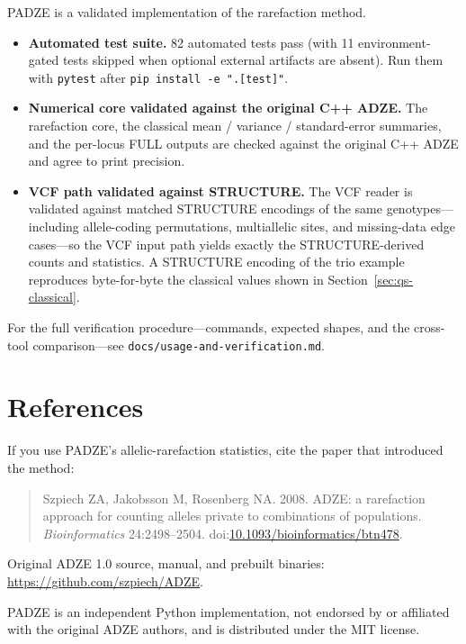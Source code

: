 \documentclass[11pt]{article}
\newcommand{\padze}{PADZE}
\begin{document}
\padze{} is a validated implementation of the rarefaction method.
\begin{itemize}
  \item \textbf{Automated test suite.} 82 automated tests pass (with 11
        environment-gated tests skipped when optional external artifacts are
        absent). Run them with \texttt{pytest} after
        \texttt{pip install -e ".[test]"}.
  \item \textbf{Numerical core validated against the original C++ ADZE.} The
        rarefaction core, the classical mean / variance / standard-error
        summaries, and the per-locus FULL outputs are checked against the
        original C++ ADZE and agree to print precision.
  \item \textbf{VCF path validated against STRUCTURE.} The VCF reader is
        validated against matched STRUCTURE encodings of the same
        genotypes---including allele-coding permutations, multiallelic sites, and
        missing-data edge cases---so the VCF input path yields exactly the
        STRUCTURE-derived counts and statistics. A STRUCTURE encoding of the trio
        example reproduces byte-for-byte the classical values shown in
        Section~\ref{sec:qs-classical}.
\end{itemize}

For the full verification procedure---commands, expected shapes, and the
cross-tool comparison---see \texttt{docs/usage-and-verification.md}.

\section{References}
\label{sec:references}

If you use \padze{}'s allelic-rarefaction statistics, cite the paper that
introduced the method:

\begin{quote}
Szpiech ZA, Jakobsson M, Rosenberg NA. 2008. ADZE: a rarefaction approach for
counting alleles private to combinations of populations. \textit{Bioinformatics}
24:2498--2504.
doi:\href{https://doi.org/10.1093/bioinformatics/btn478}{10.1093/bioinformatics/btn478}.
\end{quote}

Original ADZE 1.0 source, manual, and prebuilt binaries:
\url{https://github.com/szpiech/ADZE}.

\padze{} is an independent Python implementation, not endorsed by or affiliated
with the original ADZE authors, and is distributed under the MIT license.
\end{document}
